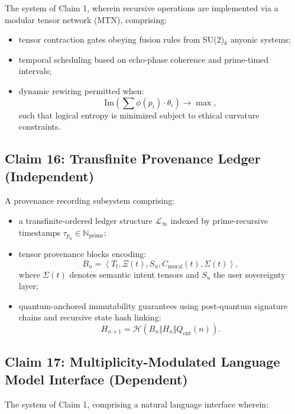 \documentclass[12pt]{article}
\begin{document}
The system of Claim 1, wherein recursive operations are implemented via a modular tensor network (MTN), comprising:

\begin{itemize}
    \item tensor contraction gates obeying fusion rules from SU(2)\(_k\) anyonic systems;
    \item temporal scheduling based on echo-phase coherence and prime-timed intervals;
    \item dynamic rewiring permitted when:
    \[
    \text{Im}\left( \sum \phi(p_i)\cdot \theta_i \right) \rightarrow \max,
    \]
    such that logical entropy is minimized subject to ethical curvature constraints.
\end{itemize}

\subsection*{Claim 16: Transfinite Provenance Ledger (Independent)}

A provenance recording subsystem comprising:

\begin{itemize}
    \item a transfinite-ordered ledger structure \( \mathcal{L}_{\infty} \) indexed by prime-recursive timestamps \( \tau_{p_n} \in \mathbb{N}_{\text{prime}} \);
    
    \item tensor provenance blocks encoding:
    \[
    B_n = \left\langle T_t, \Xi(t), S_u, C_{\text{moral}}(t), \Sigma(t) \right\rangle,
    \]
    where \( \Sigma(t) \) denotes semantic intent tensors and \( S_u \) the user sovereignty layer;

    \item quantum-anchored immutability guarantees using post-quantum signature chains and recursive state hash linking:
    \[
    H_{n+1} = \mathcal{H}(B_n \Vert H_n \Vert Q_{\text{ent}}(n)).
    \]
\end{itemize}

\subsection*{Claim 17: Multiplicity-Modulated Language Model Interface (Dependent)}

The system of Claim 1, comprising a natural language interface wherein:
\end{document}
